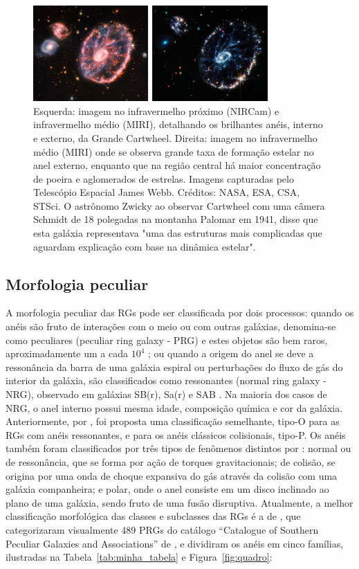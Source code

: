 \begin{figure}
  \centering 
  \includegraphics[width=0.8\textwidth]{Imagens/Cartwheel03.PNG} 
  \caption[Gálaxia Cartwheel.]{Esquerda: imagem no infravermelho próximo (NIRCam) e infravermelho médio (MIRI), detalhando os brilhantes anéis, interno e externo, da Grande Cartwheel. Direita: imagem no infravermelho médio (MIRI) onde se observa grande taxa de formação estelar no anel externo, enquanto que na região central há maior concentração de poeira e aglomerados de estrelas. Imagens capturadas pelo Telescópio Espacial James Webb. Créditos: NASA, ESA, CSA, STSci. O astrônomo Zwicky ao observar Cartwheel com uma câmera Schmidt de 18 polegadas na montanha Palomar em 1941, disse que esta galáxia representava "uma das estruturas mais complicadas que aguardam explicação com base na dinâmica estelar".}
  \label{fig:cartwheel} 
\end{figure}

\subsection{Morfologia peculiar}

A morfologia peculiar das RGs pode ser classificada por dois processos: quando os anéis são fruto de interações com o meio ou com outras galáxias, denomina-se como peculiares (peculiar ring galaxy - PRG) e estes objetos são bem raros, aproximadamente um a cada $10^\text{4}$ \cite{1987bin}; ou quando a origem do anel se deve a ressonância da barra de uma galáxia espiral ou perturbações do fluxo de gás do interior da galáxia, são classificados como ressonantes (normal ring galaxy - NRG), observado em galáxias SB(r), Sa(r) e SAB \cite{1998abans, 1995Buta}. Na maioria dos casos de NRG, o anel interno possui mesma idade, composição química e cor da galáxia. Anteriormente, por , foi proposta uma classificação semelhante, tipo-O para as RGs com anéis ressonantes, e para os anéis clássicos colisionais, tipo-P. Os anéis também foram classificados por três tipos de fenômenos distintos por : normal ou de ressonância, que se forma por ação de torques gravitacionais; de colisão, se origina por uma onda de choque expansiva do gás através da colisão com uma galáxia companheira; e polar, onde o anel consiste em um disco inclinado ao plano de uma galáxia, sendo fruto de uma fusão disruptiva. Atualmente, a melhor classificação morfológica das classes e subclasses das RGs é a de , que categorizaram visualmente 489 PRGs do catálogo “Catalogue of Southern Peculiar Galaxies and Associations” de , e dividiram os anéis em cinco famílias, ilustradas na Tabela~\ref{tab:minha_tabela} e Figura~\ref{fig:quadro}: 

